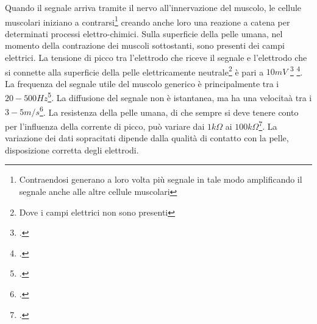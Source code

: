 \documentclass[a4paper, 10pt, final]{article} %
\begin{document}
    Quando il segnale arriva tramite il nervo all'innervazione del muscolo, le cellule muscolari iniziano a contrarsi\footnote{Contraendosi generano a loro volta pi\`{u} segnale in tale modo amplificando il segnale anche alle altre cellule muscolari} creando anche loro una reazione a catena per determinati processi elettro-chimici.
    Sulla superficie della pelle umana, nel momento della contrazione dei muscoli sottostanti, sono presenti dei campi elettrici.
    La tensione di picco tra l'elettrodo che riceve il segnale e l'elettrodo che si connette alla superficie della pelle elettricamente neutrale\footnote{Dove i campi elettrici non sono presenti} \`e pari a $10mV$ \footcite[p435]{Naik}\: \footcite[p1]{Xiaoou}.
    La frequenza del segnale utile del muscolo generico \`{e} principalmente tra i $20-500Hz$\footcite[p1]{EMGFreq}.
    La diffusione del segnale non \`{e} istantanea, ma ha una velocita\`{a} tra i $3-5m/s$\footcite[p2]{MerlettiMuceli}.
    La resistenza della pelle umana, di che sempre si deve tenere conto per l'influenza della corrente di picco, pu\`{o} variare dai $1k\Omega$ ai $100k\Omega$\footcite["Under dry conditions, the resistance offered by the human body may be as high as 100,000Ohms.  Wet or broken skin may drop the body's resistance to 1,000 Ohms", p7]{ElectricalDeaths}.
    La variazione dei dati sopracitati dipende dalla qualit\`{a} di contatto con la pelle, disposizione corretta degli elettrodi.
\end{document}
